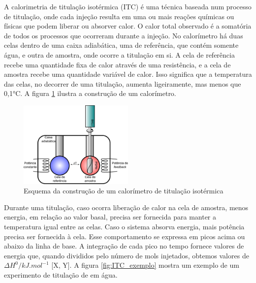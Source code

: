 		A calorimetria de titulação isotérmica (ITC) é uma técnica baseada num processo de titulação, onde cada injeção resulta em uma ou mais reações químicas ou físicas que podem liberar ou absorver calor. O calor total observado é a somatória de todos os processos que ocorreram durante a injeção. No calorímetro há duas celas dentro de uma caixa adiabática, uma de referência, que contém somente água, e outra de amostra, onde ocorre a titulação em si. A cela de referência recebe uma quantidade fixa de calor através de uma resistência, e a cela de amostra recebe uma quantidade variável de calor. Isso significa que a temperatura das celas, no decorrer de uma titulação, aumenta ligeiramente, mas menos que 0,1°C. A figura \ref{fig:ITC_esquema} ilustra a construção de um calorímetro.
		
		\begin{figure}[h]
			\centering
			\includegraphics[width=0.5\textwidth]{./imagens/itc/esquema_itc_equipamento}
			\caption{Esquema da construção de um calorímetro de titulação isotérmica}
			\label{fig:ITC_esquema}
		\end{figure} 
		
		Durante uma titulação, caso ocorra liberação de calor na cela de amostra, menos energia, em relação ao valor basal, precisa ser fornecida para manter a temperatura igual entre as celas. Caso o sistema absorva energia, mais potência precisa ser fornecida à cela. Esse comportamento se expressa em picos acima ou abaixo da linha de base. A integração de cada pico no tempo fornece valores de energia que, quando divididos pelo número de mols injetados, obtemos valores de $\Delta H^0/kJ.mol^{-1}$ [X, Y]. A figura \ref{fig:ITC_exemplo} mostra um exemplo de um experimento de titulação de \TTAB{} em água.
		
